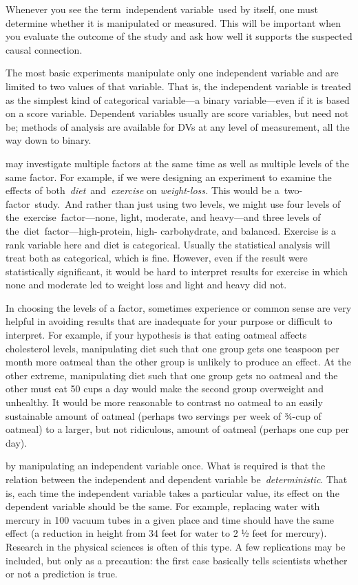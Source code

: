 \begin{refsection}
Whenever you see the term independent variable used by itself, one must determine whether it is manipulated or measured. This will be important when you evaluate the outcome of the study and ask how well it supports the suspected causal connection.

The most basic experiments manipulate only one independent variable and are limited to two values of that variable. That is, the independent variable is treated as the simplest kind of categorical variable—a binary variable—even if it is based on a score variable. Dependent variables usually are score variables, but need not be; methods of analysis are available for DVs at any level of measurement, all the way down to binary. 

 may investigate multiple factors at the same time as well as multiple levels of the same factor. For example, if we were designing an experiment to examine the effects of both \emph{diet} and \emph{exercise} on \emph{weight-loss.} This would be a two-factor study. And rather than just using two levels, we might use four levels of the exercise factor—none, light, moderate, and heavy—and three levels of the diet factor—high-protein, high- carbohydrate, and balanced. Exercise is a rank variable here and diet is categorical. Usually the statistical analysis will treat both as categorical, which is fine. However, even if the result were statistically significant, it would be hard to interpret results for exercise in which none and moderate led to weight loss and light and heavy did not.

In choosing the levels of a factor, sometimes experience or common sense are very helpful in avoiding results that are inadequate for your purpose or difficult to interpret. For example, if your hypothesis is that eating oatmeal affects cholesterol levels, manipulating diet such that one group gets one teaspoon per month more oatmeal than the other group is unlikely to produce an effect. At the other extreme, manipulating diet such that one group gets no oatmeal and the other must eat 50 cups a day would make the second group overweight and unhealthy. It would be more reasonable to contrast no oatmeal to an easily sustainable amount of oatmeal (perhaps two servings per week of ¾-cup of oatmeal) to a larger, but not ridiculous, amount of oatmeal (perhaps one cup per day).

 by manipulating an independent variable once. What is required is that the relation between the independent and dependent variable be \emph{deterministic}. That is, each time the independent variable takes a particular value, its effect on the dependent variable should be the same. For example, replacing water with mercury in 100 vacuum tubes in a given place and time should have the same effect (a reduction in height from 34 feet for water to 2 ½ feet for mercury). Research in the physical sciences is often of this type. A few replications may be included, but only as a precaution: the first case basically tells scientists whether or not a prediction is true.


\end{refsection}
